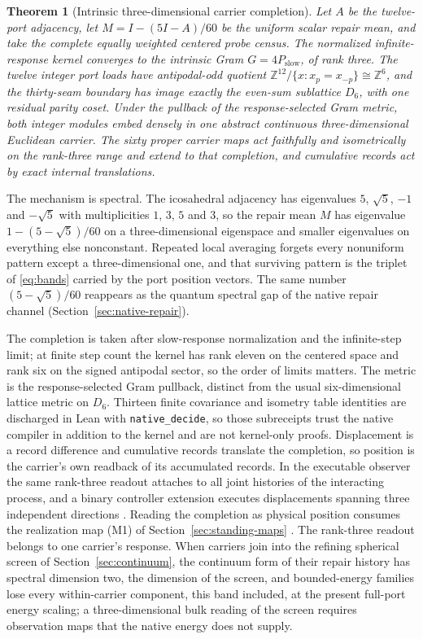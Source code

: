 \documentclass[11pt]{article}
\newtheorem{theorem}{Theorem}[section]
\theoremstyle{definition}
\theoremstyle{remark}
\begin{document}
\begin{theorem}[Intrinsic three-dimensional carrier completion]
\label{thm:rank-three}
Let $A$ be the twelve-port adjacency, let $M=I-(5I-A)/60$ be the uniform scalar repair mean, and take the complete equally weighted centered probe
census. The normalized infinite-response kernel converges to the intrinsic
Gram $G=4P_{\mathrm{slow}}$, of rank three. The twelve integer port loads have
antipodal-odd quotient $\mathbb Z^{12}/\{x:x_p=x_{-p}\}\cong\mathbb Z^6$, and
the thirty-seam boundary has image exactly the even-sum sublattice $D_6$, with
one residual parity coset. Under the pullback of the response-selected Gram
metric, both integer modules embed densely in one abstract continuous
three-dimensional Euclidean carrier. The sixty proper carrier maps act
faithfully and isometrically on the rank-three range and extend to that
completion, and cumulative records act by exact internal translations.
\end{theorem}

The mechanism is spectral. The icosahedral adjacency has eigenvalues $5$,
$\sqrt5$, $-1$ and $-\sqrt5$ with multiplicities $1$, $3$, $5$ and $3$, so the
repair mean $M$ has eigenvalue $1-(5-\sqrt5)/60$ on a three-dimensional
eigenspace and smaller eigenvalues on everything else nonconstant. Repeated local averaging forgets every nonuniform pattern except a
three-dimensional one, and that surviving pattern is the triplet of
\eqref{eq:bands} carried by the port position vectors. The same
number $(5-\sqrt5)/60$ reappears as the quantum spectral gap of the native
repair channel (Section~\ref{sec:native-repair}).

The completion is taken after slow-response normalization and the
infinite-step limit; at finite step count the kernel has rank eleven on the
centered space and rank six on the signed antipodal sector, so the order of
limits matters. The metric is the response-selected Gram pullback, distinct
from the usual six-dimensional lattice metric on $D_6$. Thirteen finite
covariance and isometry table identities are discharged in Lean with
\texttt{native\_decide}, so those subreceipts trust the native compiler in
addition to the kernel and are not kernel-only proofs. Displacement is a
record difference and cumulative records translate the completion, so
position is the carrier's own readback of its accumulated records. In the
executable observer the same rank-three readout attaches to all joint
histories of the interacting process, and a binary controller extension
executes displacements spanning three independent directions
\cite{ophmodel}. Reading the completion as physical position consumes the realization map (M1) of Section~\ref{sec:standing-maps}
\cite{ophrepo,ophMicrophysics}. The rank-three readout belongs to one
carrier's response. When carriers join into the refining spherical screen of
Section~\ref{sec:continuum}, the continuum form of their repair history has
spectral dimension two, the dimension of the screen, and bounded-energy
families lose every within-carrier component, this band included, at the
present full-port energy scaling; a three-dimensional bulk reading of the
screen requires observation maps that the native energy does not supply.
\end{document}
